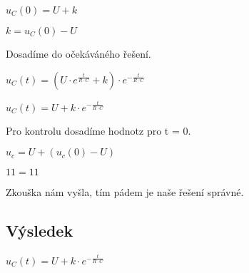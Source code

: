 \vspace{0.25cm}
$u_C(0) = U + k$

\vspace{0.25cm}
$k = u_C(0) - U$

\begin{large}
\vspace{1cm} \flushleft
Dosadíme do očekáváného řešení.
\end{large}

\vspace{0.5cm}
$u_C(t) = (U \cdot e^{\frac{t}{R \cdot C}} + k) \cdot e^{-\frac{t}{R \cdot C}}$

\vspace{0.25cm}
$u_C(t) = U + k \cdot e^{-\frac{t}{R \cdot C}}$

\begin{large}
\vspace{1cm} \flushleft
Pro kontrolu dosadíme hodnotz pro t = 0.
\end{large}

\vspace{0.5cm}
$u_c = U + (u_c(0) - U)$

\vspace{0.25cm}
$11 = 11$

\begin{large}
\vspace{1cm} \flushleft
Zkouška nám vyšla, tím pádem je naše řešení správné.
\end{large}

\subsection{Výsledek}

$u_C(t) = U + k \cdot e^{-\frac{t}{R \cdot C}}$